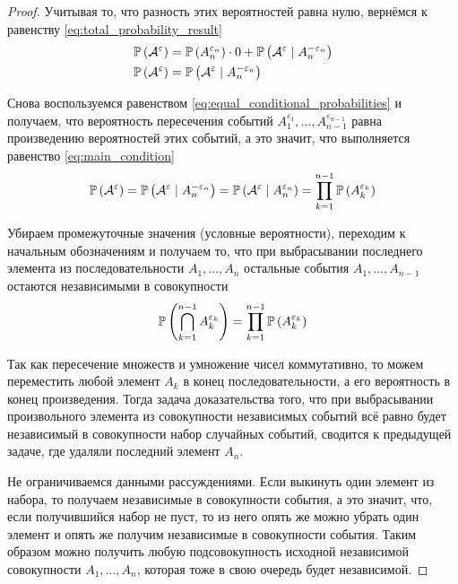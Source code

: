 \begin{proof}
    Учитывая то, что разность этих вероятностей равна нулю,
    вернёмся к равенству \eqref{eq:total_probability_result}
    \begin{align*}
            \mathbb{P}\left( \mathcal{A}^{\varepsilon} \right)
            &=\mathbb{P}\left( A_n^{\varepsilon_n} \right)\cdot 0
            +\mathbb{P}\left( \mathcal{A}^{\varepsilon}\mid A_n^{-\varepsilon_n} \right)\\
            \mathbb{P}\left( \mathcal{A}^{\varepsilon} \right)
            &=\mathbb{P}\left( \mathcal{A}^{\varepsilon}\mid A_n^{-\varepsilon_n} \right)
    \end{align*}

    Снова воспользуемся равенством \eqref{eq:equal_conditional_probabilities}
    и получаем, что вероятность пересечения
    событий $A_1^{\varepsilon_1}, \dots, A_{n-1}^{\varepsilon_{n-1}}$
    равна произведению вероятностей этих событий, а это значит,
    что выполняется равенство \eqref{eq:main_condition}
    $$\mathbb{P}\left( \mathcal{A}^{\varepsilon} \right)
      =\mathbb{P}\left( \mathcal{A}^{\varepsilon}\mid A_n^{-\varepsilon_n} \right)
      =\mathbb{P}\left( \mathcal{A}^{\varepsilon}\mid A_n^{\varepsilon_n} \right)
      =\prod_{k=1}^{n-1} \mathbb{P}\left( A_{k}^{\varepsilon_k} \right)$$

    Убираем промежуточные значения (условные вероятности),
    переходим к начальным обозначениям и получаем то, что при выбрасывании
    последнего элемента из последовательности $A_1, \dots, A_n$
    остальные события $A_1, \dots, A_{n-1}$
    остаются независимыми в совокупности
    $$\mathbb{P}\left( \bigcap_{k=1}^{n-1} A_{k}^{\varepsilon_k} \right)
    =\prod_{k=1}^{n-1} \mathbb{P}\left( A_{k}^{\varepsilon_k} \right)$$

    Так как пересечение множеств и умножение чисел коммутативно,
    то можем переместить любой элемент $A_k$ в конец последовательности,
    а его вероятность в конец произведения. Тогда задача доказательства того,
    что при выбрасывании произвольного элемента
    из совокупности независимых событий
    всё равно будет независимый в совокупности набор случайных событий,
    сводится к предыдущей задаче, где удаляли последний элемент $A_n$.

    Не ограничиваемся данными рассуждениями.
    Если выкинуть один элемент из набора,
    то получаем независимые в совокупности события,
    а это значит, что, если получившийся набор не пуст,
    то из него опять же можно убрать один элемент
    и опять же получим независимые в совокупности события.
    Таким образом можно получить любую подсовокупность
    исходной независимой совокупности $A_1, \dots, A_n$,
    которая тоже в свою очередь будет независимой.

\end{proof}
